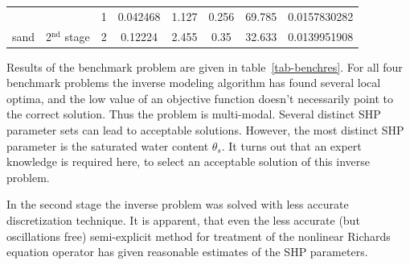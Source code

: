 \documentclass[review,times,3p,twocolumn,10pt]{elsarticle}
\begin{document}
\begin{table}[]
\begin{tabular}{|c|c|c|c|c|c|c|c}
                       &                                                                  & 1                                                & \num{0.042468}                                                & 1.127                                                        & 0.256                                                        & 69.785                                                       & \multicolumn{1}{c|}{\num{0.0157830282}}                                                                                          \\ \cline{3-8} 
\multirow{-6}{*}{sand} & \multirow{-2}{*}{2$^{\textrm{nd}}$ stage}                        & \cellcolor[HTML]{C0C0C0}2                        & \cellcolor[HTML]{C0C0C0}\num{0.12224}                         & \cellcolor[HTML]{C0C0C0}2.455                                & \cellcolor[HTML]{C0C0C0}0.35                                 & \cellcolor[HTML]{C0C0C0}32.633                               & \cellcolor[HTML]{C0C0C0}\num{0.0139951908}                                                                                       \\ \hline
\end{tabular}
\end{table}

Results of the benchmark problem are given in table~\ref{tab-benchres}. For all four benchmark problems the inverse modeling algorithm has found several local optima, and the low value of an objective function doesn't necessarily  point to the correct solution. Thus the problem is multi-modal. Several distinct SHP parameter sets can lead to acceptable solutions. However, the most distinct SHP parameter is the saturated water content $\theta_s$. It turns out that an expert knowledge is required here, to select an acceptable solution of this inverse problem.  

In the second stage the inverse problem was solved with less accurate discretization technique. It is apparent, that even the less accurate (but oscillations free) semi-explicit method for treatment of the nonlinear Richards equation operator has given  reasonable estimates of the SHP parameters. 


 
\end{document}

